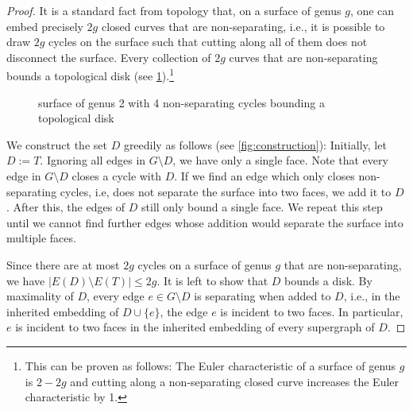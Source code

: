 \documentclass[a4paper,cleveref, autoref, thm-restate, thm-restate, UKenglish]{lipics-v2021}
\begin{document}
\begin{proof}
It is a standard fact from topology that, on a surface of genus $g$, one can embed precisely $2g$ closed curves that are non-separating, i.e., it is possible to draw $2g$ cycles on the surface such that cutting along all of them does not disconnect the surface. Every collection of $2g$ curves that are non-separating bounds a topological disk (see \cref{fig:doubletorus}).\footnote{This can be proven as follows: The Euler characteristic of a surface of genus $g$ is $2-2g$ \cite[Section 2.2]{hatcher} and cutting along a non-separating closed curve increases the Euler characteristic by 1.}
\begin{figure}
\begin{center}
\end{center}
\caption{surface of genus 2 with 4 non-separating cycles bounding a topological disk}\label{fig:doubletorus}
\end{figure}

We construct the set $D$ greedily as follows (see \cref{fig:construction}): Initially, let $D:=T$. Ignoring all edges in $G\setminus D$, we have only a single face. 
Note that every edge in $G \setminus D$ closes a cycle with $D$. 
If we find an edge which only closes non-separating cycles, i.e, does not separate the surface into two faces, we add it to $D$. After this, the edges of $D$ still only bound a single face. We repeat this step until we cannot find further edges whose addition would separate the surface into multiple faces. 

Since there are at most $2g$ cycles on a surface of genus $g$ that are non-separating, we have $|E(D) \setminus E(T)|\leq 2g$. It is left to show that $D$ bounds a disk. By maximality of $D$, every edge $e \in G \setminus D$ is separating when added to $D$, i.e., in the inherited embedding of $D \cup \{e\}$, the edge $e$ is incident to two faces. In particular, $e$ is incident to two faces in the inherited embedding of every supergraph of $D$. 


\end{proof}
\end{document}
